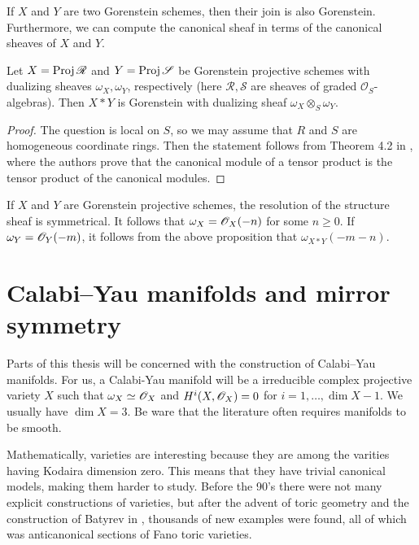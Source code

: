 If $X$ and $Y$ are two Gorenstein schemes, then their join is also Gorenstein. Furthermore, we can compute the canonical sheaf in terms of the canonical sheaves of $X$ and $Y$.

\begin{proposition}
Let $X=\operatorname{Proj} \mathscr R$ and $Y=\operatorname{Proj} \mathscr S$ be Gorenstein projective schemes with dualizing sheaves $\omega_X, \omega_Y$, respectively (here $\mathscr R,\mathscr S$ are sheaves of graded $\mathscr O_S$-algebras). Then $X \ast Y$ is Gorenstein with  dualizing sheaf $\omega_X \otimes_{S} \omega_Y$.
\end{proposition}
\begin{proof}
The question is local on $S$, so we may assume that $R$ and $S$ are homogeneous coordinate rings. Then the statement follows from Theorem 4.2 in \cite{herzog_canonical}, where the authors prove that the canonical module of a tensor product is the tensor product of the canonical modules.
\end{proof}

\begin{remark}
\label{remark:canonical}
If $X$ and $Y$ are Gorenstein projective schemes, the resolution of the structure sheaf is symmetrical. It follows that $\omega_X=\mathscr{O}_X(-n)$ for some $n \geq 0$. If $\omega_Y=\mathscr{O}_Y(-m)$, it follows from the above proposition that $\omega_{X \ast Y}(-m-n)$.
\end{remark}

\section{Calabi--Yau manifolds and mirror symmetry} %
\label{sec:calabi_yau}

Parts of this thesis will be concerned with the construction of Calabi--Yau manifolds. For us, a Calabi-Yau manifold will be a irreducible complex projective variety $X$ such that $\omega_X \simeq \mathscr{O}_X$ and $H^i(X,\mathscr{O}_X)=0$ for $i=1,\ldots,\dim X-1$. We usually have $\dim X=3$. Be ware that the literature often requires \CY manifolds to be smooth.

Mathematically, \CY varieties are interesting because they are among the varities having Kodaira dimension zero. This means that they have trivial canonical models, making them harder to study. Before the 90's  there were not many explicit constructions of \CY varieties, but after the advent of toric geometry and the construction of Batyrev in \cite{batyrev_mirrorsymmetry}, thousands of new examples were found, all of which was anticanonical sections of Fano toric varieties.

